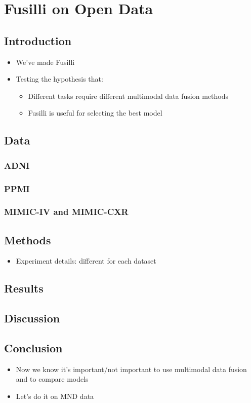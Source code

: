 \chapter{Fusilli on Open Data}
\label{fusilli_on_open_data}

\section{Introduction}
\begin{itemize}
    \item We've made Fusilli
    \item Testing the hypothesis that:
    \begin{itemize}
        \item Different tasks require different multimodal data fusion methods
        \item Fusilli is useful for selecting the best model
    \end{itemize}
\end{itemize}

\section{Data}
\subsection{ADNI}
\subsection{PPMI}
\subsection{MIMIC-IV and MIMIC-CXR}

\section{Methods}
\begin{itemize}
    \item Experiment details: different for each dataset
\end{itemize}

\section{Results}

\section{Discussion}

\section{Conclusion}
\begin{itemize}
    \item Now we know it's important/not important to use multimodal data fusion and to compare models
    \item Let's do it on MND data
\end{itemize}
